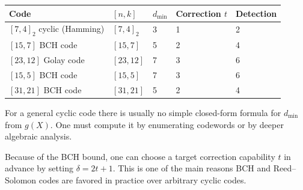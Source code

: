 
\begin{example}
\begin{center}
\renewcommand{\arraystretch}{1.2}
\begin{tabular}{@{}lllll@{}}
	\toprule
	Code & \([n,k]\) & \(d_{\min}\) & Correction \(t\) & Detection \\
	\midrule
	\([7,4]_2\) cyclic (Hamming) & \([7,4]_2\) & 3 & 1 & 2 \\
	\([15,7]\) BCH code & \([15,7]\) & 5 & 2 & 4 \\
	\([23,12]\) Golay code & \([23,12]\) & 7 & 3 & 6 \\
	\([15,5]\) BCH code & \([15,5]\) & 7 & 3 & 6 \\
	\([31,21]\) BCH code & \([31,21]\) & 5 & 2 & 4 \\
	\bottomrule
\end{tabular}
\end{center}
\end{example}

\begin{remark}
For a general cyclic code there is usually no simple closed-form formula for \(d_{\min}\) from \(g(X)\). One must compute it by enumerating codewords or by deeper algebraic analysis.
\end{remark}

\medskip
{}

\begin{remark}
Because of the BCH bound, one can choose a target correction capability \(t\) in advance by setting \(\delta = 2t+1\). This is one of the main reasons BCH and Reed--Solomon codes are favored in practice over arbitrary cyclic codes.
\end{remark}

